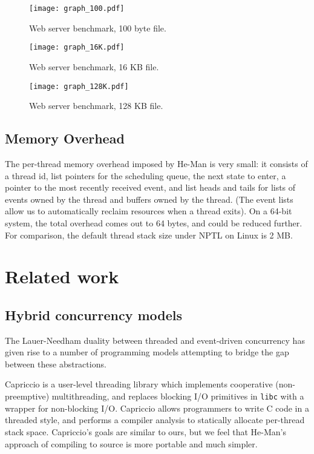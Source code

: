 \documentclass[preprint]{sigplanconf}
\renewcommand{\t}{\texttt}
\begin{document}
\begin{figure*}[!ht]
\centering
\texttt{[image: graph\_100.pdf]}
\caption{Web server benchmark, 100 byte file.}
\label{fig:graph100}
\end{figure*}
\begin{figure*}[!ht]
\centering
\texttt{[image: graph\_16K.pdf]}
\caption{Web server benchmark, 16 KB file.}
\label{fig:graph16}
\end{figure*}
\begin{figure*}[!ht]
\centering
\texttt{[image: graph\_128K.pdf]}
\caption{Web server benchmark, 128 KB file.}
\label{fig:graph128}
\end{figure*}

\subsection{Memory Overhead}

The per-thread memory overhead imposed by He-Man is very small: it consists of a
thread id, list pointers for the scheduling queue, the next state to enter, a
pointer to the most recently received event, and list heads and tails for lists
of events owned by the thread and buffers owned by the thread.  (The event lists
allow us to automatically reclaim resources when a thread exits). On a 64-bit
system, the total overhead comes out to 64 bytes, and could be reduced further.
For comparison, the default thread stack size under NPTL on Linux is 2 MB.

\section{Related work}

\subsection{Hybrid concurrency models}

The Lauer-Needham duality \cite{LauerNeedham} between threaded and event-driven
concurrency has given rise to a number of programming models attempting to
bridge the gap between these abstractions. 

Capriccio \cite{vonBehrenEtAl} is a user-level threading library which
implements cooperative (non-preemptive) multithreading, and replaces blocking
I/O primitives in \t{libc} with a wrapper for non-blocking I/O. Capriccio allows
programmers to write C code in a threaded style, and performs a compiler
analysis to statically allocate per-thread stack space. Capriccio's goals are
similar to ours, but we feel that He-Man's approach of compiling to source is
more portable and much simpler.
\end{document}
